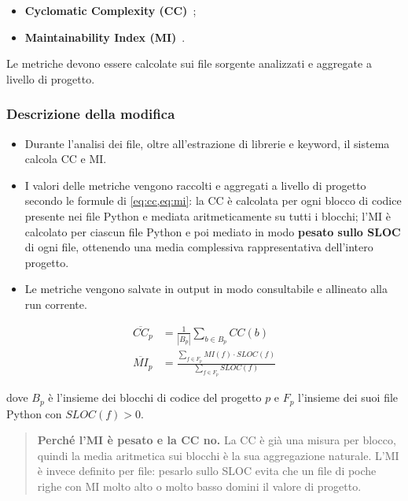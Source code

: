 \documentclass[11pt,a4paper]{article}
\newenvironment{keypoints}
  {\begin{quote}\small}
  {\end{quote}}
\begin{document}
\begin{itemize}[nosep]
  \item \textbf{Cyclomatic Complexity (CC)}~\cite{mccabe};
  \item \textbf{Maintainability Index (MI)}~\cite{colemanoman}.
\end{itemize}

Le metriche devono essere calcolate sui file sorgente analizzati e aggregate a
livello di progetto.

\subsubsection*{Descrizione della modifica}

\begin{itemize}
  \item Durante l'analisi dei file, oltre all'estrazione di librerie e keyword,
    il sistema calcola CC e MI.
  \item I valori delle metriche vengono raccolti e aggregati a livello di
    progetto secondo le formule di \cref{eq:cc,eq:mi}: la CC \`e
    calcolata per ogni blocco di codice presente nei file Python e mediata
    aritmeticamente su tutti i blocchi; l'MI \`e calcolato per ciascun file
    Python e poi mediato in modo \textbf{pesato sullo SLOC} di ogni file,
    ottenendo una media complessiva rappresentativa dell'intero progetto.
  \item Le metriche vengono salvate in output in modo consultabile e allineato
    alla run corrente.
\end{itemize}

\begin{align}
  \overline{CC}_{p} &= \frac{1}{|B_p|}\sum_{b \in B_p} CC(b)
  \label{eq:cc}\\[4pt]
  \overline{MI}_{p} &=
    \frac{\sum_{f \in F_p} MI(f)\cdot SLOC(f)}{\sum_{f \in F_p} SLOC(f)}
  \label{eq:mi}
\end{align}

dove $B_p$ \`e l'insieme dei blocchi di codice del progetto $p$ e $F_p$
l'insieme dei suoi file Python con $SLOC(f) > 0$.

\begin{keypoints}
\textbf{Perch\'e l'MI \`e pesato e la CC no.} La CC \`e gi\`a una misura per
blocco, quindi la media aritmetica sui blocchi \`e la sua aggregazione naturale.
L'MI \`e invece definito per file: pesarlo sullo SLOC evita che un file di
poche righe con MI molto alto o molto basso domini il valore di progetto.
\end{keypoints}
\end{document}
